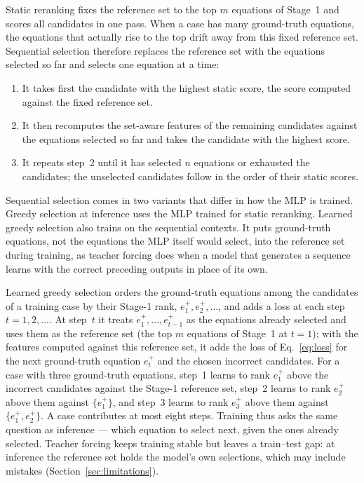 Static reranking fixes the reference set to the top $m$ equations of Stage~1 and scores all
candidates in one pass. When a case has many ground-truth equations, the equations that actually
rise to the top drift away from this fixed reference set. Sequential selection therefore replaces
the reference set with the equations selected so far and selects one equation at a time:
\begin{enumerate}
  \item It takes first the candidate with the highest static score, the score computed against the
    fixed reference set.
  \item It then recomputes the set-aware features of the remaining candidates against the equations
    selected so far and takes the candidate with the highest score.
  \item It repeats step~2 until it has selected $n$ equations or exhausted the candidates; the
    unselected candidates follow in the order of their static scores.
\end{enumerate}
Sequential selection comes in two variants that differ in how the MLP is trained. Greedy
selection at inference uses the MLP trained for static reranking. Learned greedy selection also
trains on the sequential contexts. It puts ground-truth equations, not the equations the MLP
itself would select, into the reference set during training, as teacher forcing does when a model
that generates a sequence learns with the correct preceding outputs in place of its own.

Learned greedy selection orders the ground-truth equations among the candidates of a training case
by their Stage-1 rank, $e^{+}_1, e^{+}_2, \dots$, and adds a loss at each step $t = 1, 2, \dots$.
At step~$t$ it treats $e^{+}_1, \dots, e^{+}_{t-1}$ as the equations already selected and uses them
as the reference set (the top $m$ equations of Stage~1 at $t = 1$); with the features computed
against this reference set, it adds the loss of Eq.~\eqref{eq:loss} for the next ground-truth
equation $e^{+}_t$ and the chosen incorrect candidates. For a case with three ground-truth
equations, step~1 learns to rank $e^{+}_1$ above the incorrect candidates against the Stage-1
reference set, step~2 learns to rank $e^{+}_2$ above them against $\{e^{+}_1\}$, and step~3 learns
to rank $e^{+}_3$ above them against $\{e^{+}_1, e^{+}_2\}$. A case contributes at most eight steps.
Training thus asks the same question as inference --- which equation to select next, given the
ones already selected.
Teacher forcing keeps training stable but leaves a train--test gap: at inference the reference set
holds the model's own selections, which may include mistakes (Section~\ref{sec:limitations}).
